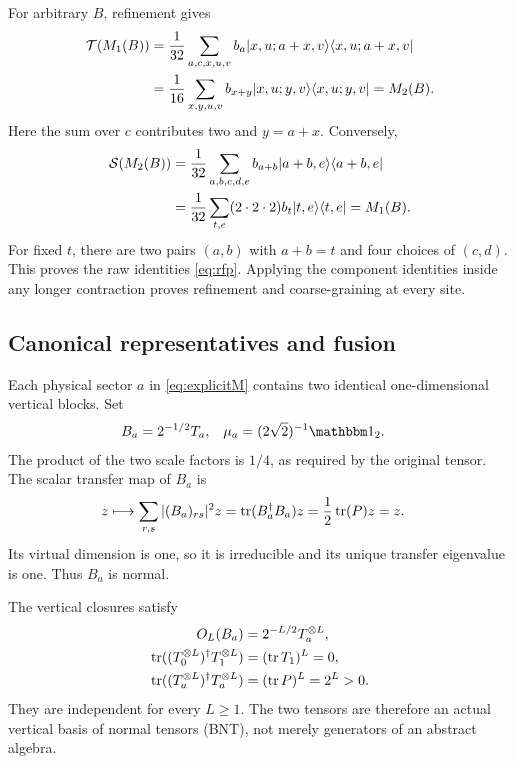 \documentclass[aps,pra,reprint,nofootinbib,onecolumn]{revtex4-2}
\begin{document}
For arbitrary $B$, refinement gives
\begin{align}
	\mathcal{T}(M_1(B))
	 & =\frac1{32}\sum_{a,c,x,u,v}b_a
	\lvert x,u;a+x,v\rangle\langle x,u;a+x,v\rvert
	\\
	 & =\frac1{16}\sum_{x,y,u,v}b_{x+y}
	\lvert x,u;y,v\rangle\langle x,u;y,v\rvert
	=M_2(B).
\end{align}
Here the sum over $c$ contributes two and $y=a+x$. Conversely,
\begin{align}
	\mathcal{S}(M_2(B))
	 & =\frac1{32}\sum_{a,b,c,d,e}b_{a+b}
	\lvert a+b,e\rangle\langle a+b,e\rvert
	\\
	 & =\frac1{32}\sum_{t,e}(2\cdot2\cdot2)b_t
	\lvert t,e\rangle\langle t,e\rvert
	=M_1(B).
\end{align}
For fixed $t$, there are two pairs $(a,b)$ with $a+b=t$ and four
choices of $(c,d)$. This proves the raw identities
\cref{eq:rfp}. Applying the component identities inside any longer
contraction proves refinement and coarse-graining at every site.

\subsection{Canonical representatives and fusion}

Each physical sector $a$ in \cref{eq:explicitM} contains two identical
one-dimensional vertical blocks. Set
\begin{align}
	B_a   & =2^{-1/2}T_a,
	      &
	\mu_a & =(2\sqrt2)^{-1}\Id_2.
	\label{eq:BNTgroup}
\end{align}
The product of the two scale factors is $1/4$, as required by the
original tensor. The scalar transfer map of $B_a$ is
\begin{align}
	z\longmapsto
	\sum_{r,s}|(B_a)_{rs}|^2z
	 & =\operatorname{tr}(B_a^\dagger B_a)z
	=\frac12\operatorname{tr}(P)z=z.
\end{align}
Its virtual dimension is one, so it is irreducible and its unique
transfer eigenvalue is one. Thus $B_a$ is normal.

The vertical closures satisfy
\begin{align}
	O_L(B_a) & =2^{-L/2}T_a^{\otimes L},
	\\
	\operatorname{tr}((T_0^{\otimes L})^\dagger T_1^{\otimes L})
	         & =(\operatorname{tr} T_1)^L=0,
	\\
	\operatorname{tr}((T_a^{\otimes L})^\dagger T_a^{\otimes L})
	         & =(\operatorname{tr} P)^L=2^L>0.
\end{align}
They are independent for every $L\geq1$. The two tensors are therefore
an actual vertical basis of normal tensors (BNT), not merely
generators of an abstract algebra.
\end{document}
